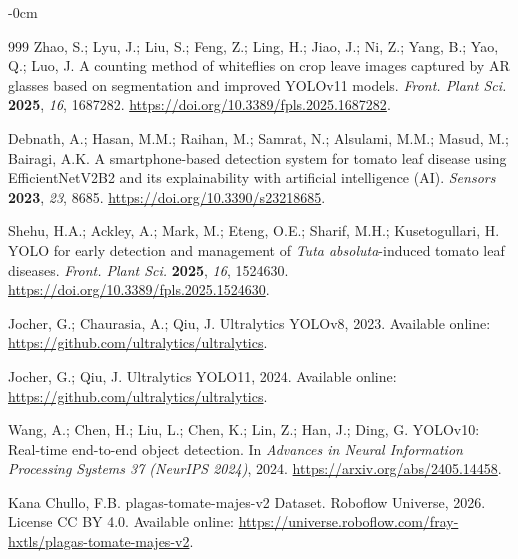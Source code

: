 \documentclass[sensors,article,submit,pdftex,moreauthors]{Definitions/mdpi}
\begin{document}
\begin{adjustwidth}{-\extralength}{0cm}
\begin{thebibliography}{999}
{\color{blue} Zhao, S.; Lyu, J.; Liu, S.; Feng, Z.; Ling, H.; Jiao, J.; Ni, Z.; Yang, B.; Yao, Q.; Luo, J. A counting method of whiteflies on crop leave images captured by AR glasses based on segmentation and improved YOLOv11 models. {\em Front. Plant Sci.} {\bf 2025}, {\em 16}, 1687282. \url{https://doi.org/10.3389/fpls.2025.1687282}.}

{\color{blue} Debnath, A.; Hasan, M.M.; Raihan, M.; Samrat, N.; Alsulami, M.M.; Masud, M.; Bairagi, A.K. A smartphone-based detection system for tomato leaf disease using EfficientNetV2B2 and its explainability with artificial intelligence (AI). {\em Sensors} {\bf 2023}, {\em 23}, 8685. \url{https://doi.org/10.3390/s23218685}.}

{\color{blue} Shehu, H.A.; Ackley, A.; Mark, M.; Eteng, O.E.; Sharif, M.H.; Kusetogullari, H. YOLO for early detection and management of \emph{Tuta absoluta}-induced tomato leaf diseases. {\em Front. Plant Sci.} {\bf 2025}, {\em 16}, 1524630. \url{https://doi.org/10.3389/fpls.2025.1524630}.}

Jocher, G.; Chaurasia, A.; Qiu, J. Ultralytics YOLOv8, 2023. Available online: \url{https://github.com/ultralytics/ultralytics}.

Jocher, G.; Qiu, J. Ultralytics YOLO11, 2024. Available online: \url{https://github.com/ultralytics/ultralytics}.

Wang, A.; Chen, H.; Liu, L.; Chen, K.; Lin, Z.; Han, J.; Ding, G. YOLOv10: Real-time end-to-end object detection. In {\em Advances in Neural Information Processing Systems 37 (NeurIPS 2024)}, 2024. \url{https://arxiv.org/abs/2405.14458}.

{\color{blue} Kana Chullo, F.B. plagas-tomate-majes-v2 Dataset. Roboflow Universe, 2026. License CC BY 4.0. Available online: \url{https://universe.roboflow.com/fray-hxtls/plagas-tomate-majes-v2}.}

\end{thebibliography}
\end{adjustwidth}
\end{document}
